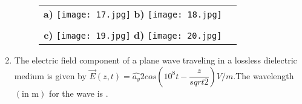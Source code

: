 \documentclass[12pt,-letter paper]{article}
\providecommand{\brak}[1]{\ensuremath{\left(#1\right)}}
\theoremstyle{remark}
\begin{document}
\begin{enumerate}
      \begin{figure}[H]
  \centering
  \begin{tabular}{cc}
    \textbf{a)} \texttt{[image: 17.jpg]} \hspace{1cm} %
    \textbf{b)} \texttt{[image: 18.jpg]}   \\     %
\\ \textbf{c)} \texttt{[image: 19.jpg]} \hspace{1cm} %
    \textbf{d)} \texttt{[image: 20.jpg]}
  \end{tabular}
 \end{figure}
 \item The electric field component of a plane wave traveling in a lossless dielectric medium is given by $\overrightarrow{E}\brak{z,t}=\hat{a_y}2cos\brak{10^8t-\dfrac{z}{sqrt2}}$$V/m$.The wavelength \brak{\text{in m}} for the wave is \underline{\hspace{1cm}}.

\end{enumerate}
\end{document}
